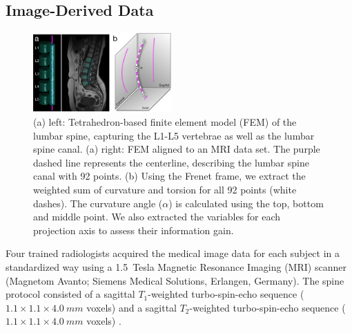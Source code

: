 \documentclass[a4paper,twoside]{style/article}
\begin{document}
\subsection{Image-Derived Data}
\begin{figure}[!h]
  \centering
  \includegraphics[width=0.475\textwidth]{figures/centerline}
  \caption{
	(a) left: Tetrahedron-based finite element model (FEM) of the lumbar spine, capturing the L1-L5 vertebrae as well as the lumbar spine canal.
	(a) right: FEM aligned to an MRI data set.
	The purple dashed line represents the centerline, describing the lumbar spine canal with 92 points.
	(b) Using the Frenet frame, we extract the weighted sum of curvature and torsion for all 92 points (white dashes).
	The curvature angle ($\alpha$) is calculated using the top, bottom and middle point.
	We also extracted the variables for each projection axis to assess their information gain.
	}
  \label{fig:centerline}
\end{figure}
Four trained radiologists acquired the medical image data for each subject in a standardized way using a 1.5~Tesla Magnetic Resonance Imaging (MRI) scanner (Magnetom Avanto; Siemens Medical Solutions, Erlangen, Germany).
The spine protocol consisted of a sagittal $T_1$-weighted turbo-spin-echo sequence ($1.1\times1.1\times4.0~mm$ voxels) and a sagittal $T_2$-weighted turbo-spin-echo sequence ($1.1\times1.1\times4.0~mm$ voxels) \cite{Hegenscheid2013}.
\end{document}
